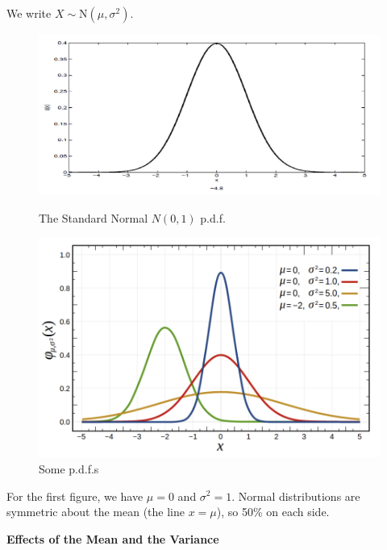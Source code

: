We write $X \sim \text{N}(\mu,\sigma^2)$.

\begin{figure}[!htb]
    \begin{minipage}{0.48\textwidth}
      \centering
      \includegraphics[width=1.05\linewidth]{img/standard-normal.png}
      \caption{The Standard Normal $N(0,1)$ p.d.f.}
    \end{minipage}\hfill
    \begin{minipage}{0.48\textwidth}
      \centering
      \includegraphics[width=0.9\linewidth]{img/different-normal.png}
      \caption{Some p.d.f.s}
    \end{minipage}
 \end{figure}

 \begin{note}
    For the first figure, we have $\mu = 0$ and $\sigma^2 = 1$. Normal distributions are symmetric about the mean (the line $x = \mu$), so 50\% on each side.
 \end{note}

 \vspace{3mm}

\textbf{Effects of the Mean and the Variance}

